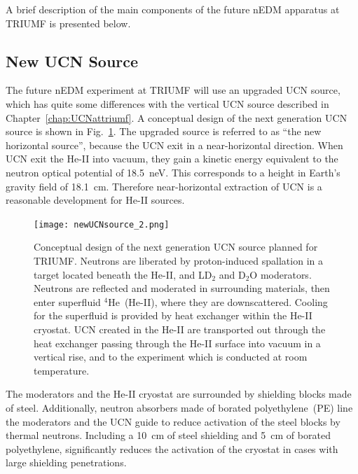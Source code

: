 A brief description of the main components of the future nEDM apparatus
at TRIUMF is presented below.

\subsection{New UCN Source\label{sec:newUCNsource}}


The future nEDM experiment at TRIUMF will use an upgraded UCN source,
which has quite some differences with the vertical UCN source
described in Chapter~\ref{chap:UCNattriumf}. A conceptual design of
the next generation UCN source is shown in
Fig.~\ref{fig:newUCNsource_2}. The upgraded source is referred to as
``the new horizontal source'', because the UCN exit in a
near-horizontal direction. When UCN exit the He-II into vacuum, they
gain a kinetic energy equivalent to the neutron optical potential of
18.5~neV. This corresponds to a height in Earth’s gravity field of
18.1~cm. Therefore near-horizontal extraction of UCN is a reasonable
development for He-II sources.

\begin{figure}[h!]
  \centering
  \texttt{[image: newUCNsource\_2.png]}
  \caption[Conceptual design of TUCAN's new UCN source]{Conceptual
    design of the next generation UCN source planned for
    TRIUMF. Neutrons are liberated by proton-induced spallation in a
    target located beneath the He-II, and LD$_2$ and D$_2$O
    moderators. Neutrons are reflected and moderated in surrounding
    materials, then enter superfluid $^4$He~(He-II), where they are
    downscattered. Cooling for the superfluid is provided by heat
    exchanger within the He-II cryostat. UCN created in the He-II are
    transported out through the heat exchanger passing through the
    He-II surface into vacuum in a vertical rise, and to the
    experiment which is conducted at room temperature.}
  \label{fig:newUCNsource_2}
\end{figure}

The moderators and the He-II cryostat are surrounded by shielding blocks
made of steel. Additionally, neutron absorbers made of borated
polyethylene~(PE) line the moderators and the UCN guide to reduce
activation of the steel blocks by thermal neutrons. Including a 10~cm
of steel shielding and 5~cm of borated polyethylene, significantly
reduces the activation of the cryostat in cases with large shielding
penetrations.

